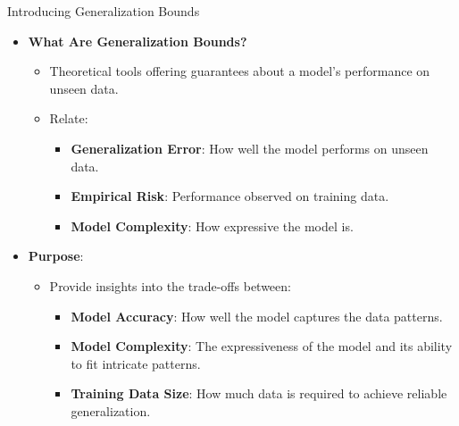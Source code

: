 \documentclass[
  ignorenonframetext,
]{beamer}
\providecommand{\tightlist}{%
  \setlength{\itemsep}{0pt}\setlength{\parskip}{0pt}}\usepackage{longtable,booktabs,array}
\begin{document}
\begin{frame}{Introducing Generalization Bounds}
\label{introducing-generalization-bounds}
\begin{itemize}
\tightlist
\item
  \textbf{What Are Generalization Bounds?}

  \begin{itemize}
  \tightlist
  \item
    Theoretical tools offering guarantees about a model's performance on
    unseen data.
  \item
    Relate:

    \begin{itemize}
    \tightlist
    \item
      \textbf{Generalization Error}: How well the model performs on
      unseen data.
    \item
      \textbf{Empirical Risk}: Performance observed on training data.
    \item
      \textbf{Model Complexity}: How expressive the model is.
    \end{itemize}
  \end{itemize}
\end{itemize}
\end{frame}

\begin{frame}
\begin{itemize}
\tightlist
\item
  \textbf{Purpose}:

  \begin{itemize}
  \tightlist
  \item
    Provide insights into the trade-offs between:

    \begin{itemize}
    \tightlist
    \item
      \textbf{Model Accuracy}: How well the model captures the data
      patterns.
    \item
      \textbf{Model Complexity}: The expressiveness of the model and its
      ability to fit intricate patterns.
    \item
      \textbf{Training Data Size}: How much data is required to achieve
      reliable generalization.
    \end{itemize}
  \end{itemize}
\end{itemize}
\end{frame}
\end{document}
